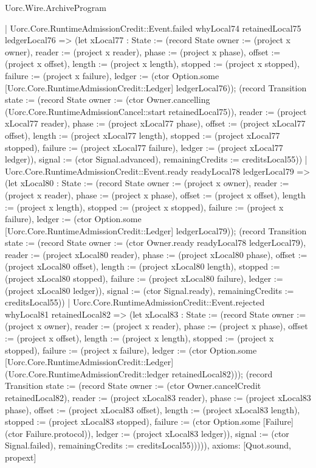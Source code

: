\begin{lexlean}{Uorc.Wire.ArchiveProgram}
\begin{semanticmodule}
{    | Uorc.Core.RuntimeAdmissionCredit::Event.failed whyLocal74 retainedLocal75 ledgerLocal76 => (let xLocal77 : State := (record State {owner := (project x owner), reader := (project x reader), phase := (project x phase), offset := (project x offset), length := (project x length), stopped := (project x stopped), failure := (project x failure), ledger := (ctor Option.some [Uorc.Core.RuntimeAdmissionCredit::Ledger] ledgerLocal76)}); (record Transition {state := (record State {owner := (ctor Owner.cancelling (Uorc.Core.RuntimeAdmissionCancel::start retainedLocal75)), reader := (project xLocal77 reader), phase := (project xLocal77 phase), offset := (project xLocal77 offset), length := (project xLocal77 length), stopped := (project xLocal77 stopped), failure := (project xLocal77 failure), ledger := (project xLocal77 ledger)}), signal := (ctor Signal.advanced), remainingCredits := creditsLocal55}))
    | Uorc.Core.RuntimeAdmissionCredit::Event.ready readyLocal78 ledgerLocal79 => (let xLocal80 : State := (record State {owner := (project x owner), reader := (project x reader), phase := (project x phase), offset := (project x offset), length := (project x length), stopped := (project x stopped), failure := (project x failure), ledger := (ctor Option.some [Uorc.Core.RuntimeAdmissionCredit::Ledger] ledgerLocal79)}); (record Transition {state := (record State {owner := (ctor Owner.ready readyLocal78 ledgerLocal79), reader := (project xLocal80 reader), phase := (project xLocal80 phase), offset := (project xLocal80 offset), length := (project xLocal80 length), stopped := (project xLocal80 stopped), failure := (project xLocal80 failure), ledger := (project xLocal80 ledger)}), signal := (ctor Signal.ready), remainingCredits := creditsLocal55}))
    | Uorc.Core.RuntimeAdmissionCredit::Event.rejected whyLocal81 retainedLocal82 => (let xLocal83 : State := (record State {owner := (project x owner), reader := (project x reader), phase := (project x phase), offset := (project x offset), length := (project x length), stopped := (project x stopped), failure := (project x failure), ledger := (ctor Option.some [Uorc.Core.RuntimeAdmissionCredit::Ledger] (Uorc.Core.RuntimeAdmissionCredit::ledger retainedLocal82))}); (record Transition {state := (record State {owner := (ctor Owner.cancelCredit retainedLocal82), reader := (project xLocal83 reader), phase := (project xLocal83 phase), offset := (project xLocal83 offset), length := (project xLocal83 length), stopped := (project xLocal83 stopped), failure := (ctor Option.some [Failure] (ctor Failure.protocol)), ledger := (project xLocal83 ledger)}), signal := (ctor Signal.failed), remainingCredits := creditsLocal55}))))),
  axioms: [Quot.sound, propext]
}


\end{semanticmodule}
\end{lexlean}
